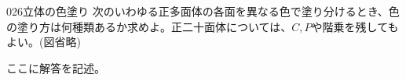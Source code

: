 \begin{thm}{026}{}{立体の色塗り}
 次のいわゆる正多面体の各面を異なる色で塗り分けるとき、色の塗り方は何種類あるか求めよ。正二十面体については、$C,P$や階乗を残してもよい。(図省略)
\end{thm}

ここに解答を記述。
